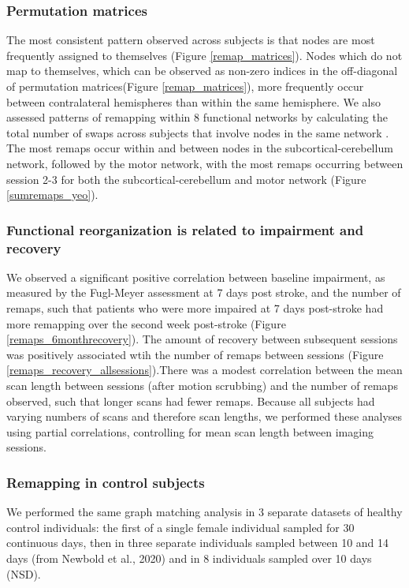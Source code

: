 \documentclass[10pt]{article}
\begin{document}
	\subsubsection*{Permutation matrices}
	The most consistent pattern observed across subjects is that nodes are most frequently assigned to themselves (Figure \ref{remap_matrices}).  Nodes which do not map to themselves, which can be observed as non-zero indices in the off-diagonal of permutation matrices(Figure \ref{remap_matrices}),  more frequently occur between contralateral hemispheres than within the same hemisphere. We also assessed patterns of remapping within 8 functional networks by calculating the total number of swaps across subjects that involve nodes in the same network . The most remaps occur within and between nodes in the subcortical-cerebellum network, followed by the motor network, with the most remaps occurring between session 2-3 for both the subcortical-cerebellum and motor network (Figure \ref{sumremaps_yeo}). 

	\subsubsection*{Functional reorganization is related to impairment and recovery}
	We observed a significant positive correlation between baseline impairment, as measured by the Fugl-Meyer assessment at 7 days post stroke, and the number of remaps, such that patients who were more impaired at 7 days post-stroke had more remapping over the second week post-stroke (Figure \ref{remaps_6monthrecovery}). The amount of recovery between subsequent sessions was positively associated wtih the number of remaps between sessions (Figure \ref{remaps_recovery_allsessions}).There was a modest correlation between the mean scan length between sessions (after motion scrubbing) and the number of remaps observed,  such that longer scans had fewer remaps. Because all subjects had varying numbers of scans and therefore scan lengths, we performed these analyses using partial correlations, controlling for mean scan length between imaging sessions.
	
	\subsubsection*{Remapping in control subjects}
	We performed the same graph matching analysis in 3 separate datasets of healthy control individuals: the first of a single female individual sampled for 30 continuous days, then in three separate individuals sampled between 10 and 14 days (from Newbold et al., 2020) and in 8 individuals sampled over 10 days (NSD). 
	
\end{document}
